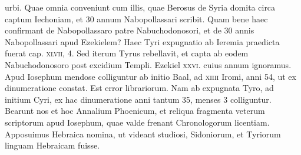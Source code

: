urbi.
Quae omnia conveniunt cum illis, quae Berosus de Syria
domita circa captum Iechoniam, et 30 annum Nabopollassari scribit.
Quam bene haec confirmant de Nabopollassaro patre Nabuchodonosori,
et de 30 annis Nabopollassari apud Ezekielem?
Haec Tyri expugnatio ab Ieremia praedicta fuerat cap. \textsc{xlvii}, 4.
Sed iterum
Tyrus rebellavit, et capta ab eodem Nabuchodonosoro post
excidium Templi.
Ezekiel \textsc{xxvi}. cuius annum ignoramus.
Apud
Iosephum mendose colliguntur ab initio Baal, ad \textsc{xiiii} Iromi, anni
54, ut ex dinumeratione constat.
Est error librariorum.
Nam ab expugnata
Tyro, ad initium Cyri, ex hac dinumeratione anni tantum
35, menses 3 colliguntur.
Bearunt nos et hoc Annalium Phoenicum,
et reliqua fragmenta veterum scriptorum apud Iosephum, quae valde
frenant Chronologorum licentiam.
Apposuimus Hebraica
nomina, ut videant studiosi, Sidoniorum, et Tyriorum linguam
Hebraicam fuisse.

